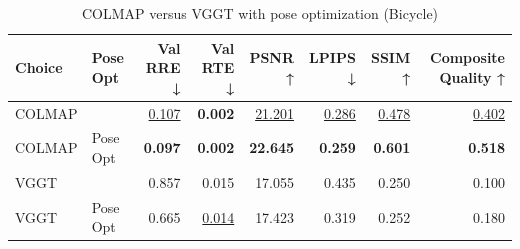 \begin{table}[H]
\caption{COLMAP versus VGGT with pose optimization (Bicycle)}
\label{tab:04_pose_opt_bicycle}
\begin{tabular}{llrrrrrr}
\toprule
Choice & Pose Opt & Val RRE ↓ & Val RTE ↓ & PSNR ↑ & LPIPS ↓ & SSIM ↑ & Composite Quality ↑ \\
\midrule
COLMAP &  & \underline{0.107} & \textbf{0.002} & \underline{21.201} & \underline{0.286} & \underline{0.478} & \underline{0.402} \\
COLMAP & Pose Opt & \textbf{0.097} & \textbf{0.002} & \textbf{22.645} & \textbf{0.259} & \textbf{0.601} & \textbf{0.518} \\
VGGT &  & 0.857 & 0.015 & 17.055 & 0.435 & 0.250 & 0.100 \\
VGGT & Pose Opt & 0.665 & \underline{0.014} & 17.423 & 0.319 & 0.252 & 0.180 \\
\bottomrule
\end{tabular}
\end{table}
